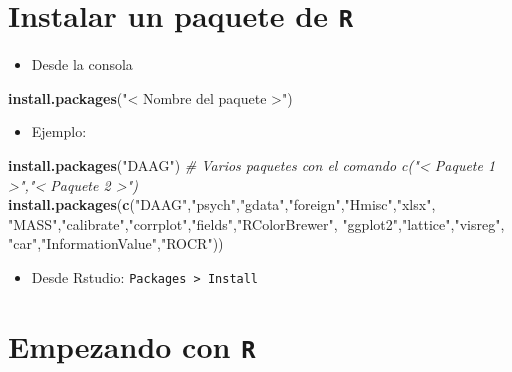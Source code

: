 \documentclass[]{book}
\newenvironment{Shaded}{\begin{snugshade}}{\end{snugshade}}
\newcommand{\KeywordTok}[1]{\textcolor[rgb]{0.13,0.29,0.53}{\textbf{#1}}}
\newcommand{\StringTok}[1]{\textcolor[rgb]{0.31,0.60,0.02}{#1}}
\newcommand{\CommentTok}[1]{\textcolor[rgb]{0.56,0.35,0.01}{\textit{#1}}}
\newcommand{\NormalTok}[1]{#1}
\providecommand{\tightlist}{%
  \setlength{\itemsep}{0pt}\setlength{\parskip}{0pt}}
\begin{document}
\section{\texorpdfstring{Instalar un paquete de
\texttt{R}}{Instalar un paquete de R}}\label{instalar-un-paquete-de-r}

\begin{itemize}
\tightlist
\item
  Desde la consola
\end{itemize}

\begin{Shaded}
\begin{Highlighting}[]
\KeywordTok{install.packages}\NormalTok{(}\StringTok{"< Nombre del paquete >"}\NormalTok{)}
\end{Highlighting}
\end{Shaded}

\begin{itemize}
\tightlist
\item
  Ejemplo:
\end{itemize}

\begin{Shaded}
\begin{Highlighting}[]
\KeywordTok{install.packages}\NormalTok{(}\StringTok{"DAAG"}\NormalTok{)}
\CommentTok{# Varios paquetes con el comando c("< Paquete 1 >","< Paquete 2 >")}
\KeywordTok{install.packages}\NormalTok{(}\KeywordTok{c}\NormalTok{(}\StringTok{"DAAG"}\NormalTok{,}\StringTok{"psych"}\NormalTok{,}\StringTok{"gdata"}\NormalTok{,}\StringTok{"foreign"}\NormalTok{,}\StringTok{"Hmisc"}\NormalTok{,}\StringTok{"xlsx"}\NormalTok{,}
                   \StringTok{"MASS"}\NormalTok{,}\StringTok{"calibrate"}\NormalTok{,}\StringTok{"corrplot"}\NormalTok{,}\StringTok{"fields"}\NormalTok{,}\StringTok{"RColorBrewer"}\NormalTok{,}
                   \StringTok{"ggplot2"}\NormalTok{,}\StringTok{"lattice"}\NormalTok{,}\StringTok{"visreg"}\NormalTok{,}
                   \StringTok{"car"}\NormalTok{,}\StringTok{"InformationValue"}\NormalTok{,}\StringTok{"ROCR"}\NormalTok{)) }
\end{Highlighting}
\end{Shaded}

\begin{itemize}
\tightlist
\item
  Desde Rstudio: \texttt{Packages\ \textgreater{}\ Install}
\end{itemize}

\section{\texorpdfstring{Empezando con
\texttt{R}}{Empezando con R}}\label{empezando-con-r}
\end{document}
